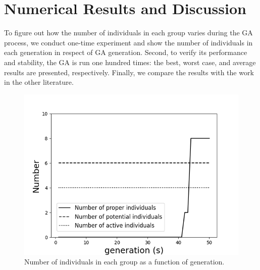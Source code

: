\section{Numerical Results and Discussion}
To figure out how the number of individuals in each group varies during the GA
process, we conduct one-time experiment and show the number of individuals
in each generation in respect of GA generation. Second, to verify its
performance and stability, the GA is run one hundred times: the best, worst
case, and average results are presented, respectively. Finally, we compare
the results with the work in the other literature.

\begin{figure}[!tb]
	\centering
	\includegraphics[width=\linewidth]{Figures/chapter4/part1/fig/group_number.png}
	\caption{Number of individuals in each group as a function of generation.}
	\label{fig:group}
\end{figure}

